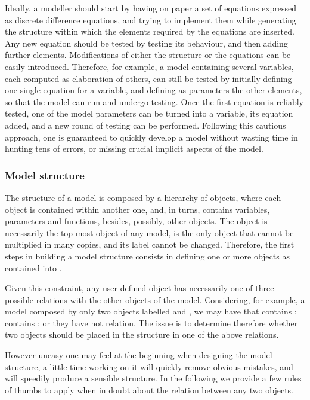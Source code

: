 \documentclass [11pt,a4paper] {book}
\begin{document}
Ideally, a modeller should start by having on paper a set of equations expressed as discrete difference equations, and trying to implement them while generating the structure within which the elements required by the equations are inserted. Any new equation should be tested by testing its behaviour, and then adding further elements. Modifications of either the structure or the equations can be easily introduced. Therefore, for example, a model containing several variables, each computed as elaboration of others, can still be tested by initially defining one single equation for a variable, and defining as parameters the other elements, so that the model can run and undergo testing. Once the first equation is reliably tested, one of the model parameters can be turned into a variable, its equation added, and a new round of testing can be performed. Following this cautious approach, one is guaranteed to quickly develop a model without wasting time in hunting tens of errors, or missing crucial implicit aspects of the model.


\subsubsection{Model structure}

The structure of a model is composed by a hierarchy of objects, where each object is contained within another one, and, in turns, contains variables, parameters and functions, besides, possibly, other objects. The object  is necessarily the top-most object of any model, is the only object that cannot be multiplied in many copies, and its label cannot be changed. Therefore, the first steps in building a model structure consists in defining one or more objects as contained into .

Given this constraint, any user-defined object has necessarily one of three possible relations with the other objects of the model. Considering, for example, a model composed by only two objects labelled  and , we may have that  contains ;  contains ; or they have not relation. The issue is to determine therefore whether two objects should be placed in the structure in one of the above relations.

However uneasy one may feel at the beginning when designing the model structure, a little time working on it will quickly remove obvious mistakes, and will speedily produce a sensible structure. In the following we provide a few rules of thumbs to apply when in doubt about the relation between any two objects.
\end{document}
